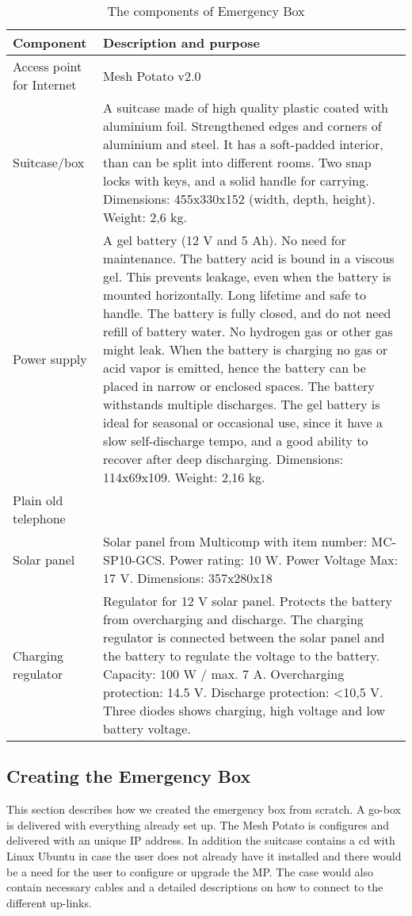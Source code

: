\begin{center}
\begin{table}[t]
\caption{\label{tab:components}The components of Emergency Box}
    \begin{tabular}{ | l | p{9cm} |}
    \hline
    \textbf{Component} & \textbf{Description and purpose} \\ 
    \hline
    Access point for Internet &  Mesh Potato v2.0\\ 
    \hline
    Suitcase/box &  A suitcase made of high quality plastic coated with aluminium foil. Strengthened edges and corners of aluminium and steel. It has a soft-padded interior, than can be split into different rooms. Two snap locks with keys, and a solid handle for carrying. Dimensions: 455x330x152 (width, depth, height). Weight: 2,6 kg. \\ 
    \hline
    Power supply & A gel battery (12 V and 5 Ah). No need for maintenance. The battery acid is bound in a viscous gel. This prevents leakage, even when the battery is mounted horizontally. Long lifetime and safe to handle. The battery is fully closed, and do not need refill of battery water. No hydrogen gas or other gas might leak. When the battery is charging no gas or acid vapor is emitted, hence the battery can be placed in narrow or enclosed spaces. The battery withstands multiple discharges. The gel battery is ideal for seasonal or occasional use, since it have a slow self-discharge tempo, and a good ability to recover after deep discharging. Dimensions: 114x69x109. Weight: 2,16 kg. \\
    \hline
    Plain old telephone & \\
	\hline
	Solar panel & Solar panel from Multicomp with item number: MC-SP10-GCS. Power rating: 10 W. Power Voltage Max: 17 V. Dimensions: 357x280x18\\
	\hline
	Charging regulator & Regulator for 12 V solar panel. Protects the battery from overcharging and discharge. The charging regulator is connected between the solar panel and the battery to regulate the voltage to the battery. Capacity: 100 W / max. 7 A. Overcharging protection: 14.5 V. Discharge protection: <10,5 V. Three diodes shows charging, high voltage and low battery voltage. \\
	\hline
    \end{tabular}
   \end{table}
\end{center}

\subsection{Creating the Emergency Box}
This section describes how we created the emergency box from scratch. A go-box is delivered with everything already set up. The Mesh Potato is configures and delivered with an unique IP address. In addition the suitcase contains a cd with Linux Ubuntu in case the user does not already have it installed and there would be a need for the user to configure or upgrade the MP. The case would also contain necessary cables and a detailed descriptions on how to connect to the different up-links. 

